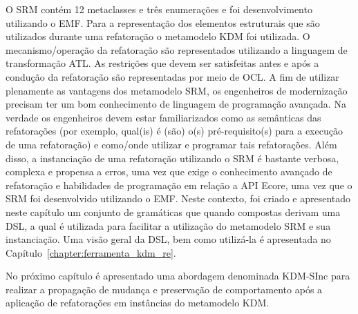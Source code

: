 O SRM contém 12 metaclasses e três enumerações e foi desenvolvimento utilizando o EMF. Para a representação dos elementos estruturais que são utilizados durante uma refatoração o metamodelo KDM foi utilizada. O mecanismo/operação da refatoração são representados utilizando a linguagem de transformação ATL. As restrições que devem ser satisfeitas antes e após a condução da refatoração são representadas por meio de OCL. A fim de utilizar plenamente as vantagens dos metamodelo SRM, os engenheiros de modernização precisam ter um bom conhecimento de linguagem de programação avançada. Na verdade os engenheiros devem estar familiarizados como as semânticas das refatorações (por exemplo, qual(is) é (são) o(s) pré-requisito(s) para a execução de uma refatoração) e como/onde utilizar e programar tais refatorações. Além disso, a instanciação de uma refatoração utilizando o SRM é bastante verbosa, complexa e propensa a erros, uma vez que exige o conhecimento avançado de refatoração e habilidades de programação em relação a API Ecore, uma vez que o SRM foi desenvolvido utilizando o EMF. Neste contexto, foi criado e apresentado neste capítulo um conjunto de gramáticas que quando compostas derivam uma DSL, a qual é utilizada para facilitar a utilização do metamodelo SRM e sua instanciação. Uma visão geral da DSL, bem como utilizá-la é apresentada no Capítulo~\ref{chapter:ferramenta_kdm_re}. %

No próximo capítulo é apresentado uma abordagem denominada KDM-SInc para realizar a propagação de mudança e preservação de comportamento após a aplicação de refatorações em instâncias do metamodelo KDM. 


